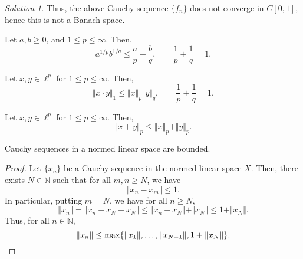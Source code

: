 \documentclass[11pt]{article}
\newcommand{\N}{\mathbb{N}}
\newcommand{\norm}[1]{\Vert #1 \Vert}
\theoremstyle{definition}
\theoremstyle{remark}
\newtheorem*{solution}{Solution}
\begin{document}
\begin{exercise}
\begin{solution}
            Thus, the above Cauchy sequence $\{f_n\}$ does not converge in $C[0, 1]$,
            hence this is not a Banach space.
        \end{solution}
    \end{exercise}

    \begin{lemma}[Young]
        Let $a, b \geq 0$, and $1 \leq p \leq \infty$. Then, \[
            a^{1 / p} b^{1 / q} \leq \frac{a}{p} + \frac{b}{q}, \qquad
            \frac{1}{p} + \frac{1}{q} = 1.
        \]
    \end{lemma}

    \begin{lemma}[H\"older]
        Let $x, y \in \ell^p$ for $1 \leq p \leq \infty$. Then, \[
            \norm{x\cdot y}_1 \leq \norm{x}_p \norm{y}_q, \qquad
            \frac{1}{p} + \frac{1}{q} = 1.
        \]
    \end{lemma}

    \begin{lemma}[Minkowski]
        Let $x, y \in \ell^p$ for $1 \leq p \leq \infty$. Then, \[
            \norm{x + y}_p \leq \norm{x}_p + \norm{y}_p.
        \]
    \end{lemma}

    \begin{lemma}
        Cauchy sequences in a normed linear space are bounded.
    \end{lemma}
    \begin{proof}
        Let $\{x_n\}$ be a Cauchy sequence in the normed linear space $X$. Then,
        there exists $N \in \N$ such that for all $m, n \geq N$, we have \[
            \norm{x_n - x_m} \leq 1.
        \] In particular, putting $m = N$, we have for all $n \geq N$, \[
            \norm{x_n} = \norm{x_n - x_N + x_N} \leq \norm{x_n - x_N} + \norm{x_N}
            \leq 1 + \norm{x_N}.
        \] Thus, for all $n \in \N$, \[
            \norm{x_n} \leq \max\{\norm{x_1}, \dots, \norm{x_{N - 1}}, 1 +
            \norm{x_N}\}. \qedhere
        \]
    \end{proof}
\end{document}
